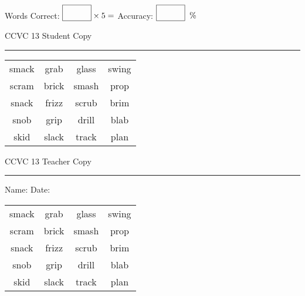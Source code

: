 \documentclass{memoir}
\begin{document}
\normalsize

Words Correct: $\fbox{\phantom{\huge 100}} \times 5 = $ Accuracy: $\fbox{\phantom{\huge 100}}\;\; \%$ 

\vfill

\newpage


\footnotesize \noindent
CCVC 13 \hfill Student Copy
\smallskip
\hrule

\Large

\setlength{\tabcolsep}{14pt}
\def\arraystretch{3}

{\selectfont


\begin{vplace}[0.5]
\begin{center}
\begin{tabular}{cccc}
smack & grab                    & glass & swing \\
scram & brick       & smash & prop \\
snack & frizz & scrub & brim      \\
snob & grip      & drill & blab             \\
skid & slack            & track       & plan \\
\end{tabular}
\end{center}
\end{vplace}

}

\newpage

\footnotesize \noindent
CCVC 13 \hfill Teacher Copy
\smallskip
\hrule

\normalsize

\vfill

\noindent
Name: \underline{\hspace{1.75in}} \hfill Date: \underline{\hspace{1in}}

\Large

{\selectfont


\begin{vplace}[0.5]
\begin{center}
\begin{tabular}{cccc}
smack & grab                    & glass & swing \\
scram & brick       & smash & prop \\
snack & frizz & scrub & brim      \\
snob & grip      & drill & blab             \\
skid & slack            & track       & plan \\
\end{tabular}
\end{center}
\end{vplace}



}
\end{document}
